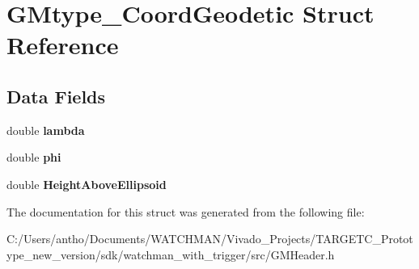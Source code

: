 \section{G\+Mtype\+\_\+\+Coord\+Geodetic Struct Reference}
\label{struct_g_mtype___coord_geodetic}
\subsection*{Data Fields}
\begin{DoxyCompactItemize}
\item 
\mbox{\label{struct_g_mtype___coord_geodetic_a3db359547eed8cfd48ca821d95f577af}} 
double {\bfseries lambda}
\item 
\mbox{\label{struct_g_mtype___coord_geodetic_adae8d8a6ff28515e505bb1c07f2b33c8}} 
double {\bfseries phi}
\item 
\mbox{\label{struct_g_mtype___coord_geodetic_a47a5987864ed61d4803e07eeb04e8e92}} 
double {\bfseries Height\+Above\+Ellipsoid}
\end{DoxyCompactItemize}


The documentation for this struct was generated from the following file\+:\begin{DoxyCompactItemize}
\item 
C\+:/\+Users/antho/\+Documents/\+W\+A\+T\+C\+H\+M\+A\+N/\+Vivado\+\_\+\+Projects/\+T\+A\+R\+G\+E\+T\+C\+\_\+\+Prototype\+\_\+new\+\_\+version/sdk/watchman\+\_\+with\+\_\+trigger/src/G\+M\+Header.\+h\end{DoxyCompactItemize}
